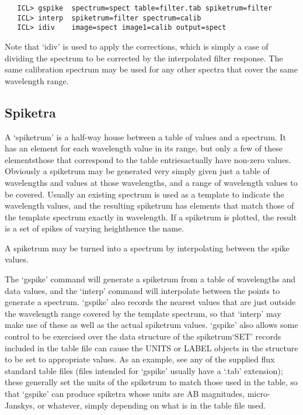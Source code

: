 \begin{verbatim}
   ICL> gspike  spectrum=spect table=filter.tab spiketrum=filter
   ICL> interp  spiketrum=filter spectrum=calib
   ICL> idiv    image=spect image1=calib output=spect
\end{verbatim}

   Note that `idiv' is used to apply the corrections, which is simply a
   case of dividing the spectrum to be corrected by the interpolated
   filter response.  The same calibration spectrum may be used for any
   other spectra that cover the same wavelength range.


\subsection{\label{techno4}Spiketra}

   A `spiketrum' is a half-way house between a table of values and a
   spectrum.  It has an element for each wavelength value in its range,
   but only a few of these elements\latorhtm{---}{-}those that correspond to
   the table entries\latorhtm{---}{-}actually have non-zero values.
   Obviously a spiketrum may
   be generated very simply given just a table of wavelengths and values
   at those wavelengths, and a range of wavelength values to be covered.
   Usually an existing spectrum is used as a template to indicate the
   wavelength values, and the resulting spiketrum has elements that
   match those of the template spectrum exactly in wavelength.  If a
   spiketrum is plotted, the result is a set of spikes of varying
   height\latorhtm{---}{-}hence the name.

   A spiketrum may be turned into a spectrum by interpolating between
   the spike values.

   The `gspike' command will generate a spiketrum from a table of
   wavelengths and data values, and the `interp' command will
   interpolate between the points to generate a spectrum.  `gspike' also
   records the nearest values that are just outside the wavelength range
   covered by the template spectrum, so that `interp' may make use of
   these as well as the actual spiketrum values. `gspike' also allows
   some control to be exercised over the data structure of the
   spiketrum\latorhtm{---}{-}`SET' records included in the table file
   can cause the UNITS or
   LABEL objects in the structure to be set to appropriate values. As an
   example, see any of the supplied flux standard table files (files
   intended for `gspike' usually have a `.tab' extension); these
   generally set the units of the spiketrum to match those used in the
   table, so that `gspike' can produce spiketra whose units are AB
   magnitudes, micro-Janskys, or whatever, simply depending on what is
   in the table file used.

